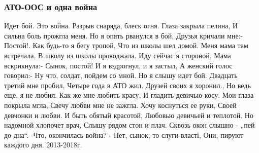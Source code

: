  
 
 

\subsubsection{АТО-ООС и одна война}

Идет бой. Это война.
Разрыв снаряда, блеск огня.
Глаза закрыла пелина,
И сильна боль прожгла меня.
Но я опять рванулся в бой,
Друзья кричали мне:- Постой!.
Как будь-то я бегу тропой,
Что из школы шел домой.
Меня мама там встречала,
В школу из школы проводжала.
Иду сейчас я стороной,
Мама вскрикнула:- Сынок, постой!
И я вздрогнул, и я застыл,
А женский голос говорил:-
Ну что, солдат, пойдем со мной.
Но я слышу идет бой.
Двадцать третий мне пробил,
Четыре года в АТО жил.
Друзей своих я хоронил.,
Но ведь еще, я не любил.
Как же мне любить красу,
И гладить девичью косу.
Мои глаза покрыла мгла,
Свечу любви мне не зажгла.
Хочу коснуться ее руки,
Своей девчонки и любви.
И быть обятый красотой,
Любовью девичьей и теплотой.
Но надомной хлопочет врач,
Слышу рядом стон и плач.
Сквозь окон слышно - „пей до дна“.
-Что, окончилась война?
- Нет, сынок, то слуги власті,
Они, пируют каждого дня.
2013-2018г.

